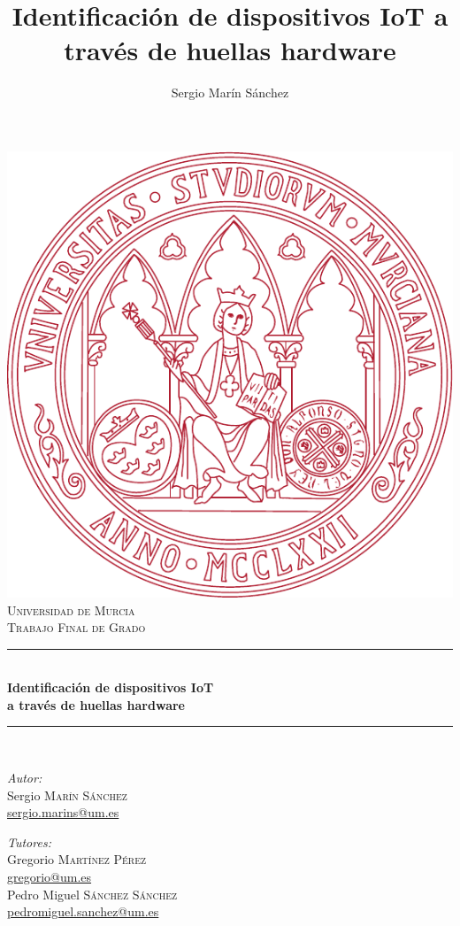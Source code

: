 \documentclass[a4paper,12pt]{book}
\newcommand{\HRule}{\rule{\linewidth}{0.5mm}}
\begin{document}
\title{Identificación de dispositivos IoT a través de huellas hardware}
\author{Sergio Marín Sánchez}

\begin{titlepage}
 
\begin{center}
 
\vfill

\includegraphics[height=0.5\textwidth]{escudo}\\[2.5cm]
 
\textsc{\LARGE Universidad de Murcia}\\[0.5cm]
 
\textsc{\Large Trabajo Final de Grado}\\[0.5cm]
 
\HRule \\[0.4cm]
{ \huge \bfseries Identificación de dispositivos IoT}\\[0.4cm]
{ \huge \bfseries  a través de huellas hardware}\\[0.4cm]
\HRule \\[1.5cm]
 
\begin{minipage}{0.4\textwidth}
\begin{flushleft} \large
\emph{Autor:}\\
Sergio \textsc{Marín Sánchez}\\
\href{mailto:sergio.marins@um.es}{sergio.marins@um.es}
\end{flushleft}
\end{minipage}
\begin{minipage}{0.4\textwidth}
\begin{flushright} \large
\emph{Tutores:} \\
Gregorio \textsc{Martínez Pérez}\\
\href{mailto:gregorio@um.es}{gregorio@um.es}\\
Pedro Miguel \textsc{Sánchez Sánchez}\\
\href{mailto:pedromiguel.sanchez@um.es}{pedromiguel.sanchez@um.es}
\end{flushright}
\end{minipage}
 
\vfill
 
{\large {}}
 
\end{center}
 
\end{titlepage}
\end{document}
